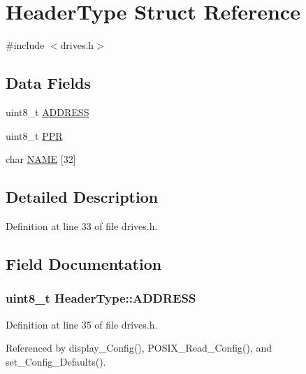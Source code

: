 \hypertarget{structHeaderType}{}\section{Header\+Type Struct Reference}
\label{structHeaderType}


{\ttfamily \#include $<$drives.\+h$>$}

\subsection*{Data Fields}
\begin{DoxyCompactItemize}
\item 
uint8\+\_\+t \hyperlink{structHeaderType_a70edfd477c537b2fa51c1aa63fcc7bee}{A\+D\+D\+R\+E\+SS}
\item 
uint8\+\_\+t \hyperlink{structHeaderType_ac642cdad0f3874495afa0ab687a56fd0}{P\+PR}
\item 
char \hyperlink{structHeaderType_aab6f096f40fee03da66178f67c730ff9}{N\+A\+ME} \mbox{[}32\mbox{]}
\end{DoxyCompactItemize}


\subsection{Detailed Description}


Definition at line 33 of file drives.\+h.



\subsection{Field Documentation}
\subsubsection[{\texorpdfstring{A\+D\+D\+R\+E\+SS}{ADDRESS}}]{\setlength{\rightskip}{0pt plus 5cm}uint8\+\_\+t Header\+Type\+::\+A\+D\+D\+R\+E\+SS}\hypertarget{structHeaderType_a70edfd477c537b2fa51c1aa63fcc7bee}{}\label{structHeaderType_a70edfd477c537b2fa51c1aa63fcc7bee}


Definition at line 35 of file drives.\+h.



Referenced by display\+\_\+\+Config(), P\+O\+S\+I\+X\+\_\+\+Read\+\_\+\+Config(), and set\+\_\+\+Config\+\_\+\+Defaults().

